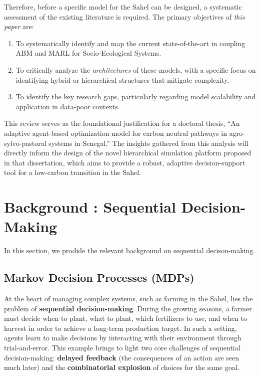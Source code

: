 \documentclass[conference]{IEEEtran}
\begin{document}
Therefore, before a specific model for the Sahel can be designed, a systematic assessment of the existing literature is required. The primary objectives of \textit{this paper} are:
\begin{enumerate}
    \item To systematically identify and map the current state-of-the-art in coupling ABM and MARL for Socio-Ecological Systems.
    \item To critically analyze the \textit{architectures} of these models, with a specific focus on identifying hybrid or hierarchical structures that mitigate complexity.
    \item To identify the key research gaps, particularly regarding model scalability and application in data-poor contexts.
\end{enumerate}

This review serves as the foundational justification for a doctoral thesis, ``An adaptive agent-based optimization model for carbon neutral pathways in agro-sylvo-pastoral systems in Senegal.'' The insights gathered from this analysis will directly inform the design of the novel hierarchical simulation platform proposed in that dissertation, which aims to provide a robust, adaptive decision-support tool for a low-carbon transition in the Sahel.

\section{Background : Sequential Decision-Making}

In this section, we prodide the relevant background on sequential decison-making.

\subsection{Markov Decision Processes (MDPs)}

At the heart of managing complex systems, such as farming in the Sahel, lies the problem of \textbf{sequential decision-making}. During the growing seasons, a farmer must decide when to plant, what to plant, which fertilizers to use, and when to harvest in order to achieve a long-term production target. In such a setting, agents learn to make decisions by interacting with their environment through trial-and-error. This example brings to light two core challenges of sequential decision-making: \textbf{delayed feedback} (the consequences of an action are seen much later) and the \textbf{combinatorial explosion} of choices for the same goal.
\end{document}
